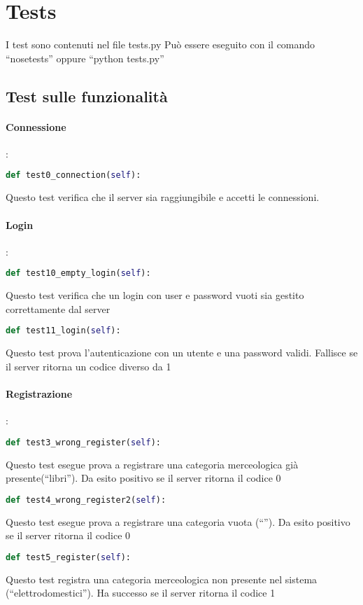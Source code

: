 \section{Tests}
I test sono contenuti nel file tests.py
Può essere eseguito con il comando ``nosetests'' oppure ``python tests.py''
\subsection{Test sulle funzionalità}
\paragraph{\textbf{Connessione}}:
\begin{lstlisting}[language=python]
def test0_connection(self):
\end{lstlisting}
Questo test verifica che il server sia raggiungibile e accetti le connessioni.
\paragraph{\textbf{Login}}:
\begin{lstlisting}[language=python]
def test10_empty_login(self):
\end{lstlisting}
Questo test verifica che un login con user e password vuoti sia gestito correttamente dal server
\begin{lstlisting}[language=python]
def test11_login(self):
\end{lstlisting}
Questo test prova l'autenticazione con un utente e una password validi. Fallisce se il server ritorna un codice diverso da 1
\paragraph{\textbf{Registrazione}}:
\begin{lstlisting}[language=python]
def test3_wrong_register(self):
\end{lstlisting}
Questo test esegue prova a registrare una categoria merceologica già presente(``libri''). Da esito positivo se il server ritorna il codice 0

\begin{lstlisting}[language=python]
def test4_wrong_register2(self):
\end{lstlisting}
Questo test esegue prova a registrare una categoria vuota (``''). Da esito positivo se il server ritorna il codice 0

\begin{lstlisting}[language=python]
def test5_register(self):
\end{lstlisting}
Questo test registra una categoria merceologica non presente nel sistema (``elettrodomestici''). Ha successo se il server ritorna il codice 1

